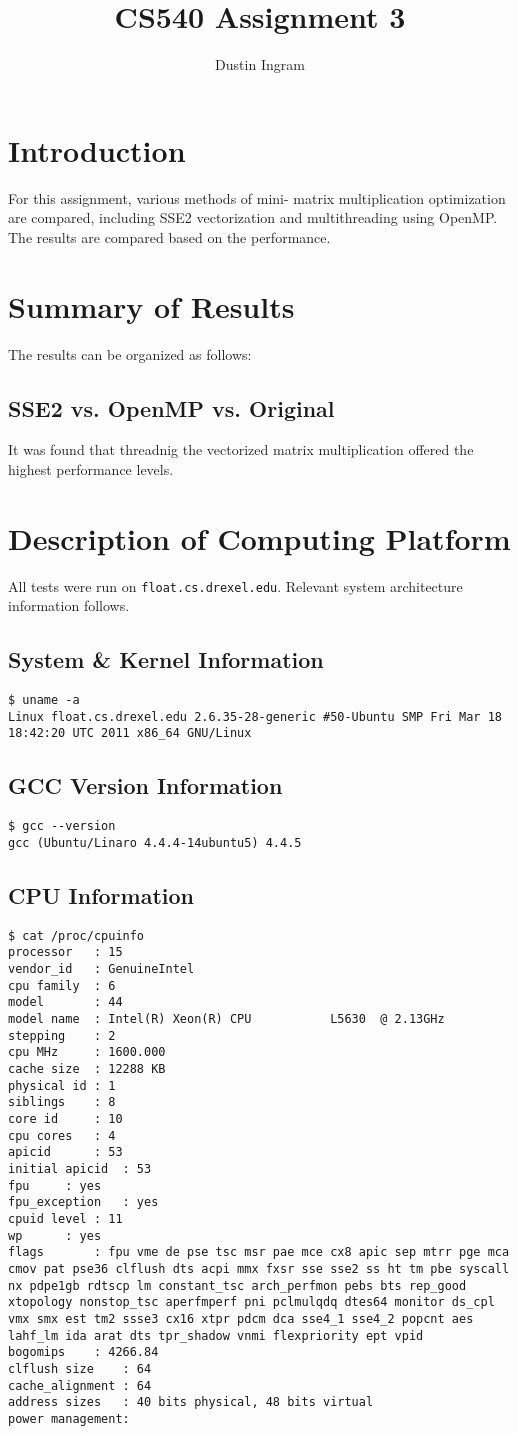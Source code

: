 \documentclass{article}
\title{CS540 Assignment 3}
\author{Dustin Ingram}
\begin{document}
\maketitle
\newpage
\section{Introduction}
For this assignment, various methods of mini- matrix multiplication optimization are compared, including SSE2 vectorization and multithreading using OpenMP. The results are compared based on the performance.
\section{Summary of Results}
The results can be organized as follows:
\subsection{SSE2 vs. OpenMP vs. Original}
It was found that threadnig the vectorized matrix multiplication offered the highest performance levels. 
\section{Description of Computing Platform}
All tests were run on \texttt{float.cs.drexel.edu}. Relevant system architecture information follows.
\subsection{System \& Kernel Information}
\begin{lstlisting}
$ uname -a
Linux float.cs.drexel.edu 2.6.35-28-generic #50-Ubuntu SMP Fri Mar 18 18:42:20 UTC 2011 x86_64 GNU/Linux
\end{lstlisting}
\subsection{GCC Version Information}
\begin{lstlisting}
$ gcc --version
gcc (Ubuntu/Linaro 4.4.4-14ubuntu5) 4.4.5
\end{lstlisting}
\subsection{CPU Information}
\begin{lstlisting}
$ cat /proc/cpuinfo
processor	: 15
vendor_id	: GenuineIntel
cpu family	: 6
model		: 44
model name	: Intel(R) Xeon(R) CPU           L5630  @ 2.13GHz
stepping	: 2
cpu MHz		: 1600.000
cache size	: 12288 KB
physical id	: 1
siblings	: 8
core id		: 10
cpu cores	: 4
apicid		: 53
initial apicid	: 53
fpu		: yes
fpu_exception	: yes
cpuid level	: 11
wp		: yes
flags		: fpu vme de pse tsc msr pae mce cx8 apic sep mtrr pge mca cmov pat pse36 clflush dts acpi mmx fxsr sse sse2 ss ht tm pbe syscall nx pdpe1gb rdtscp lm constant_tsc arch_perfmon pebs bts rep_good xtopology nonstop_tsc aperfmperf pni pclmulqdq dtes64 monitor ds_cpl vmx smx est tm2 ssse3 cx16 xtpr pdcm dca sse4_1 sse4_2 popcnt aes lahf_lm ida arat dts tpr_shadow vnmi flexpriority ept vpid
bogomips	: 4266.84
clflush size	: 64
cache_alignment	: 64
address sizes	: 40 bits physical, 48 bits virtual
power management:
\end{lstlisting}
\end{document}
